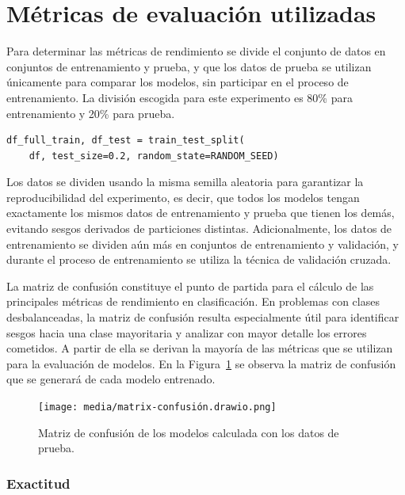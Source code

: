 \documentclass[11pt,a4paper,spanish]{book}
\numberwithin{equation}{chapter}
\numberwithin{figure}{chapter}
\begin{document}
\section{Métricas de evaluación utilizadas}


Para determinar las métricas de rendimiento se divide el conjunto de datos en conjuntos 
de entrenamiento y prueba, y que los datos de prueba se utilizan únicamente para 
comparar los modelos, sin participar en el proceso de entrenamiento. La división 
escogida para este experimento es 80\% para entrenamiento y 20\% para prueba. 


\vspace{5mm}
\begin{lstlisting}
df_full_train, df_test = train_test_split(
    df, test_size=0.2, random_state=RANDOM_SEED)
\end{lstlisting}


Los datos se dividen usando la misma semilla aleatoria para garantizar la 
reproducibilidad del experimento, es decir, que todos los modelos tengan exactamente 
los mismos datos de entrenamiento y prueba que tienen los demás, evitando sesgos 
derivados de particiones distintas. Adicionalmente, los datos de entrenamiento se 
dividen aún más en conjuntos de entrenamiento y validación, y durante el proceso de 
entrenamiento se utiliza la técnica de validación cruzada. 


La matriz de confusión constituye el punto de partida para el cálculo de las principales 
métricas de rendimiento en clasificación. En problemas con clases desbalanceadas, la 
matriz de confusión resulta especialmente útil para identificar sesgos hacia una clase 
mayoritaria y analizar con mayor detalle los errores cometidos. A partir de ella se 
derivan la mayoría de las métricas que se utilizan para la evaluación de modelos. En la 
Figura~\ref{fig:figMatrixConfusion} se observa la matriz de confusión que se generará 
de cada modelo entrenado. 



\begin{figure}[h]
    \caption{Matriz de confusión de los modelos calculada con los datos de prueba.}
    \centering
    \texttt{[image: media/matrix-confusión.drawio.png]}
    \label{fig:figMatrixConfusion}
\end{figure}


\subsubsection{Exactitud}
\end{document}
